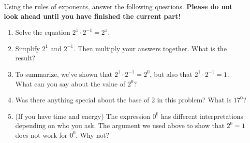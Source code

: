 \documentclass[noauthor,noinstructornotes]{ximera}
\begin{document}
\begin{problem}
Using the rules of exponents, answer the following questions.
\textbf{Please do not look ahead until you have finished the current part!}

\begin{enumerate}
    \item Solve the equation \(2^1 \cdot 2^{-1} = 2^x\).
    \item Simplify \(2^1\) and \(2^{-1}\). Then multiply your answers together.
    What is the result?
    \item To summarize, we've shown that \(2^1 \cdot 2^{-1} = 2^0\), but
    also that \(2^1 \cdot 2^{-1} = 1\). What can you say about the value
    of \(2^0\)?
    \item Was there anything special about the base of 2 in this
    problem? What is \(17^0\)?
    \item (If you have time and energy) The expression \(0^0\) has 
    different interpretations depending on who you ask. The argument
    we used above to show that \(2^0 = 1\) does not work for \(0^0\).
    Why not?
\end{enumerate}
\end{problem}
\end{document}
